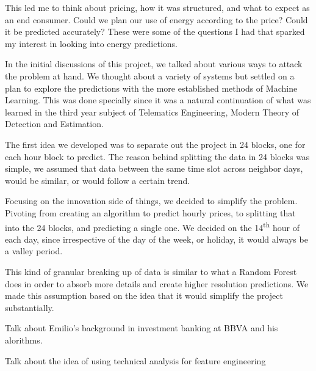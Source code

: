 \documentclass[12pt]{report} %
\begin{document}
This led me to think about pricing, how it was structured, and what to expect as an end consumer.
Could we plan our use of energy according to the price?
Could it be predicted accurately?
These were some of the questions I had that sparked my interest in looking into energy predictions.

In the initial discussions of this project, we talked about various ways to attack the problem at hand.
We thought about a variety of systems but settled on a plan to explore the predictions with the more established methods of Machine Learning.
This was done specially since it was a natural continuation of what was learned in the third year subject of Telematics Engineering, Modern Theory of Detection and Estimation.

The first idea we developed was to separate out the project in 24 blocks, one for each hour block to predict.
The reason behind splitting the data in 24 blocks was simple, we assumed that data between the same time slot across neighbor days, would be similar, or would follow a certain trend.

Focusing on the innovation side of things, we decided to simplify the problem.
Pivoting from creating an algorithm to predict hourly prices, to splitting that into the 24 blocks, and predicting a single one.
We decided on the 14\textsuperscript{th} hour of each day, since irrespective of the day of the week, or holiday, it would always be a valley period.

This kind of granular breaking up of data is similar to what a Random Forest does in order to absorb more details and create higher resolution predictions. We made this assumption based on the idea that it would simplify the project substantially.

Talk about Emilio's background in investment banking at BBVA and his alorithms.

Talk about the idea of using technical analysis for feature engineering



\end{document}
